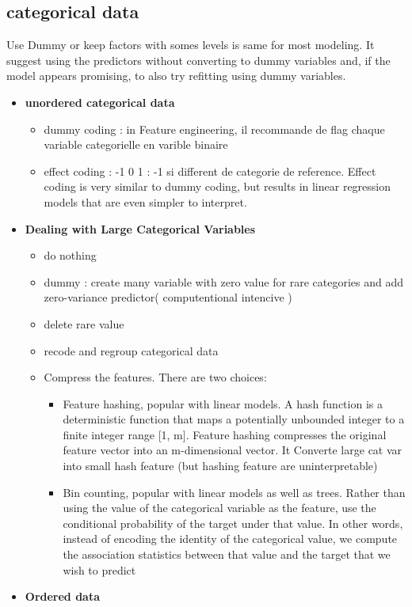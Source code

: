 \documentclass[]{book}
\providecommand{\tightlist}{%
  \setlength{\itemsep}{0pt}\setlength{\parskip}{0pt}}
\theoremstyle{definition}
\theoremstyle{definition}
\theoremstyle{definition}
\theoremstyle{remark}
\begin{document}
\subsection{categorical data}\label{categorical-data}

Use Dummy or keep factors with somes levels is same for most modeling.
It suggest using the predictors without converting to dummy variables
and, if the model appears promising, to also try refitting using dummy
variables.

\begin{itemize}
\tightlist
\item
  \textbf{unordered categorical data}

  \begin{itemize}
  \tightlist
  \item
    dummy coding : in Feature engineering, il recommande de flag chaque
    variable categorielle en varible binaire
  \item
    effect coding : -1 0 1 : -1 si different de categorie de reference.
    Effect coding is very similar to dummy coding, but results in linear
    regression models that are even simpler to interpret.
  \end{itemize}
\item
  \textbf{Dealing with Large Categorical Variables}

  \begin{itemize}
  \tightlist
  \item
    do nothing
  \item
    dummy : create many variable with zero value for rare categories and
    add zero-variance predictor( computentional intencive )
  \item
    delete rare value
  \item
    recode and regroup categorical data
  \item
    Compress the features. There are two choices:

    \begin{itemize}
    \tightlist
    \item
      Feature hashing, popular with linear models. A hash function is a
      deterministic function that maps a potentially unbounded integer
      to a finite integer range {[}1, m{]}. Feature hashing compresses
      the original feature vector into an m-dimensional vector. It
      Converte large cat var into small hash feature (but hashing
      feature are uninterpretable)
    \item
      Bin counting, popular with linear models as well as trees. Rather
      than using the value of the categorical variable as the feature,
      use the conditional probability of the target under that value. In
      other words, instead of encoding the identity of the categorical
      value, we compute the association statistics between that value
      and the target that we wish to predict
    \end{itemize}
  \end{itemize}
\item
  \textbf{Ordered data}


\end{itemize}
\end{document}
